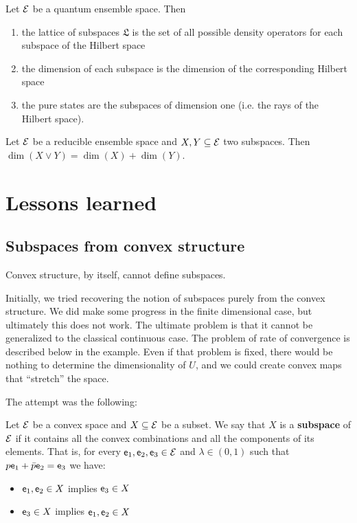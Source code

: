 \begin{conj}
	Let $\mathcal{E}$ be a quantum ensemble space. Then
	\begin{enumerate}
		\item the lattice of subspaces $\mathfrak{L}$ is the set of all possible density operators for each subspace of the Hilbert space
		\item the dimension of each subspace is the dimension of the corresponding Hilbert space
		\item the pure states are the subspaces of dimension one (i.e. the rays of the Hilbert space).
	\end{enumerate}
\end{conj}

\begin{conj}
	Let $\mathcal{E}$ be a reducible ensemble space and $X,Y \subseteq{\mathcal{E}}$ two subspaces. Then $\dim(X \vee Y) = \dim(X) + \dim(Y)$.
\end{conj}

\section{Lessons learned}

\subsection{Subspaces from convex structure}

\begin{insight}
	Convex structure, by itself, cannot define subspaces.
\end{insight}

Initially, we tried recovering the notion of subspaces purely from the convex structure. We did make some progress in the finite dimensional case, but ultimately this does not work. The ultimate problem is that it cannot be generalized to the classical continuous case. The problem of rate of convergence is described below in the example. Even if that problem is fixed, there would be nothing to determine the dimensionality of $U$, and we could create convex maps that ``stretch'' the space.

The attempt was the following:

\begin{defn}
	Let $\mathcal{E}$ be a convex space and $X \subseteq \mathcal{E}$ be a subset. We say that $X$ is a \textbf{subspace} of $\mathcal{E}$ if it contains all the convex combinations and all the components of its elements. That is, for every $\mathsf{e}_1, \mathsf{e}_2, \mathsf{e}_3 \in \mathcal{E}$ and $\lambda \in (0,1)$ such that $p \mathsf{e}_1 + \bar{p} \mathsf{e}_2 = \mathsf{e}_3$ we have:
	\begin{itemize}
		\item $\mathsf{e}_1, \mathsf{e}_2 \in X$ implies $\mathsf{e}_3 \in X$
		\item $\mathsf{e}_3 \in X$ implies $\mathsf{e}_1, \mathsf{e}_2 \in X$
	\end{itemize}
\end{defn}

